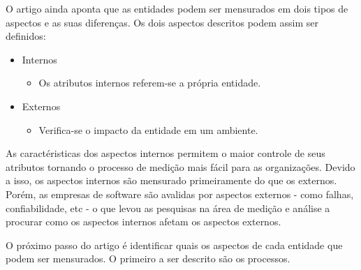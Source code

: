 \documentclass{article}
\begin{document}
O artigo ainda aponta que as entidades podem ser mensurados em dois tipos de aspectos e as suas diferenças. Os dois aspectos descritos podem assim ser definidos:
\begin{itemize}
\item   Internos
        \begin{itemize}
        \item[] Os atributos internos referem-se a própria entidade.
        \end{itemize}
\item    Externos 
        \begin{itemize}
        \item[]  Verifica-se o impacto da entidade em um ambiente.
        \end{itemize}
\end{itemize}

As caractéristicas dos aspectos internos permitem o maior controle de seus atributos tornando o processo de medição mais fácil para as organizações. Devido a isso, os aspectos internos são mensurado primeiramente do que os externos. Porém, as empresas de software são avalidas por aspectos externos - como falhas, confiabilidade, etc - o que levou as pesquisas na área de medição e análise a procurar como os aspectos internos afetam os aspectos externos.  

O próximo passo do artigo é identificar quais os aspectos de cada entidade que podem ser mensurados. O primeiro a ser descrito são os processos.
\end{document}
